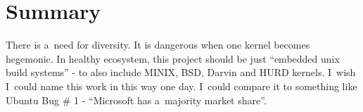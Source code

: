 \documentclass[printmode]{mgr}
\begin{document}
\section{Summary}


There is a~need for diversity. It is dangerous when one kernel becomes hegemonic. In healthy ecosystem, this project should be just ``embedded unix build systems'' - to also include MINIX, BSD, Darvin and HURD kernels. I~wish I~could name this work in this way one day. I~could compare it to something like Ubuntu Bug \# 1 - ``Microsoft has a~majority market share''.\cite{web:ubuntu-bug1}





































\end{document}
